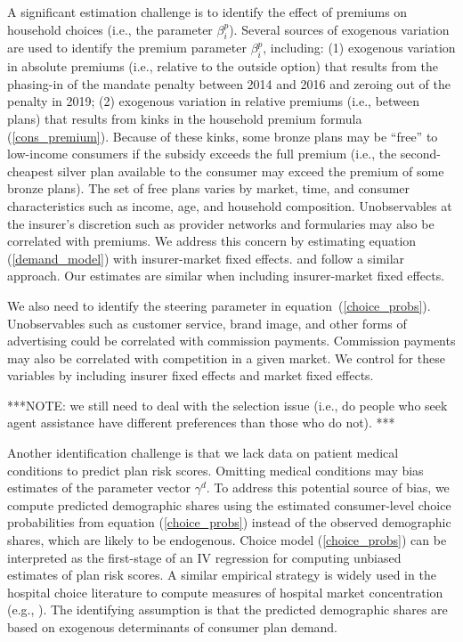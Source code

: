 \documentclass[12pt]{article}
\begin{document}
A significant estimation challenge is to identify the effect of premiums on household choices (i.e., the parameter $\beta_i^p$).  Several sources of exogenous variation are used to identify the premium parameter $\beta_i^p$, including: (1) exogenous variation in absolute premiums (i.e., relative to the outside option) that results from the phasing-in of the mandate penalty between 2014 and 2016 and zeroing out of the penalty in 2019; (2) exogenous variation in relative premiums (i.e., between plans) that results from kinks in the household premium formula (\ref{cons_premium}).  Because of these kinks, some bronze plans may be ``free'' to low-income consumers if the subsidy exceeds the full premium (i.e., the second-cheapest silver plan available to the consumer may exceed the premium of some bronze plans).   The set of free plans varies by market, time, and consumer characteristics such as income, age, and household composition.  Unobservables at the insurer's discretion such as provider networks and formularies may also be correlated with premiums.  We address this concern by estimating  equation (\ref{demand_model}) with insurer-market fixed effects.  \citet{Ho2014} and \citet{Tebaldi2020} follow a similar approach.  Our estimates are  similar when including insurer-market fixed effects.

We also need to identify the steering parameter in equation~(\ref{choice_probs}).  Unobservables such as customer service, brand image, and other forms of advertising could be correlated with commission payments.   Commission payments may also be correlated with competition in a given market.  We control for these variables by including insurer fixed effects and market fixed effects.  

***NOTE: we still need to deal with the selection issue (i.e., do people who seek agent assistance have different preferences than those who do not).  ***

Another identification challenge is that we lack data on patient medical conditions to predict plan risk scores. Omitting medical conditions may bias estimates of the parameter vector $\gamma^d$.  To address this potential source of bias, we compute predicted demographic shares using the estimated consumer-level choice probabilities from equation (\ref{choice_probs}) instead of the observed demographic shares, which are likely to be endogenous.  Choice model (\ref{choice_probs}) can be interpreted as the first-stage of an IV regression for computing unbiased estimates of plan risk scores.  A similar empirical strategy is widely used in the hospital choice literature to compute measures of hospital market concentration (e.g., \citet{Kessler2000}).  The identifying assumption is that the predicted demographic shares are based on exogenous determinants of consumer plan demand.
\end{document}
